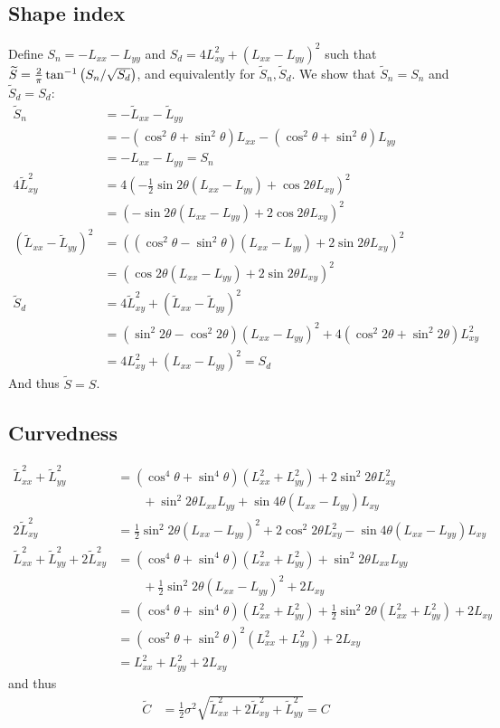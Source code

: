\documentclass[thesis.tex]{subfiles}
\begin{document}
\subsection{Shape index} \label{apx:rotation_si}
%
Define $S_n = -L_{xx} - L_{yy}$ and $S_d = 4 L_{xy}^2 + (L_{xx} - L_{yy})^2$ such that $\widetilde{S} = \frac{2}{\pi} \tan^{-1} \left( S_n/\sqrt{S_d} \right)$, and equivalently for $\widetilde{S}_n,\widetilde{S}_d$. We show that $\widetilde{S}_n = S_n$ and $\widetilde{S}_d = S_d$:
%
\begin{align}
\widetilde{S}_n &= - \widetilde{L}_{xx} - \widetilde{L}_{yy} \\
&= -(\cos^2 \theta + \sin^2 \theta)  L_{xx} - (\cos^2 \theta + \sin^2 \theta) L_{yy} \\
&= -L_{xx} - L_{yy} = S_n \\
4\widetilde{L}_{xy}^2 &= 4(-\frac12 \sin 2\theta (L_{xx} - L_{yy}) + \cos 2\theta L_{xy})^2 \\
&= (- \sin 2\theta (L_{xx} - L_{yy}) + 2 \cos 2\theta L_{xy})^2 \\
(\widetilde{L}_{xx} - \widetilde{L}_{yy})^2 &= ((\cos^2 \theta - \sin^2 \theta) (L_{xx} - L_{yy}) + 2 \sin 2\theta L_{xy})^2 \\
&= (\cos 2\theta (L_{xx} - L_{yy}) + 2 \sin 2\theta L_{xy})^2 \\
\widetilde{S}_d &= 4\widetilde{L}_{xy}^2 + (\widetilde{L}_{xx} - \widetilde{L}_{yy})^2 \\
&= (\sin^2 2\theta - \cos^2 2\theta) (L_{xx} - L_{yy})^2 + 4 (\cos^2 2\theta + \sin^2 2\theta) L_{xy}^2 \\
&= 4 L_{xy}^2 + (L_{xx} - L_{yy})^2 = S_d
\end{align}
%
And thus $\widetilde{S} = S$.
%
\subsection{Curvedness} \label{apx:rotation_c}
%
\begin{align}
\widetilde{L}_{xx}^2 + \widetilde{L}_{yy}^2
&= (\cos^4 \theta + \sin^4 \theta) (L_{xx}^2 + L_{yy}^2) + 2 \sin^2 2\theta L_{xy}^2 \\ &\qquad + \sin^2 2\theta L_{xx} L_{yy} + \sin 4\theta (L_{xx} - L_{yy}) L_{xy} \\
2 \widetilde{L}_{xy}^2 &= \frac12 \sin^2 2\theta (L_{xx} - L_{yy})^2 + 2 \cos^2 2\theta L_{xy}^2 - \sin 4\theta (L_{xx} - L_{yy}) L_{xy} \\
\widetilde{L}_{xx}^2 + \widetilde{L}_{yy}^2 + 2 \widetilde{L}_{xy}^2
&= (\cos^4 \theta + \sin^4 \theta) (L_{xx}^2 + L_{yy}^2) + \sin^2 2\theta L_{xx} L_{yy} \\ &\qquad + \frac12 \sin^2 2\theta (L_{xx} - L_{yy})^2 + 2 L_{xy} \\
&= (\cos^4 \theta + \sin^4 \theta) (L_{xx}^2 + L_{yy}^2) + \frac12 \sin^2 2\theta (L_{xx}^2 + L_{yy}^2) + 2 L_{xy} \\
&= (\cos^2 \theta + \sin^2 \theta)^2 (L_{xx}^2 + L_{yy}^2) + 2 L_{xy} \\
&= L_{xx}^2 + L_{yy}^2 + 2 L_{xy}
\end{align}
%
and thus
%
\begin{align}
\widetilde{C} &= \frac12 \sigma^2 \sqrt{\widetilde{L}_{xx}^2 + 2 \widetilde{L}_{xy}^2 + \widetilde{L}_{yy}^2} = C
\end{align}
%
\end{document}
